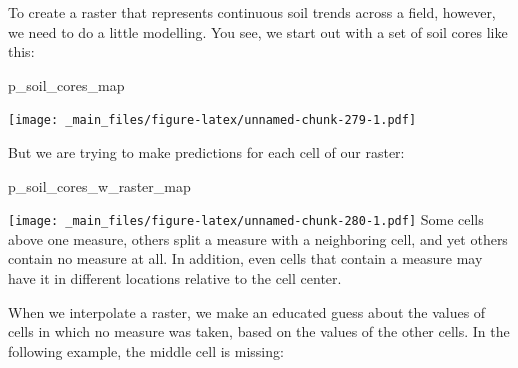 \documentclass[
]{book}
\newenvironment{Shaded}{\begin{snugshade}}{\end{snugshade}}
\newcommand{\NormalTok}[1]{#1}
\begin{document}
To create a raster that represents continuous soil trends across a field, however, we need to do a little modelling. You see, we start out with a set of soil cores like this:

\begin{Shaded}
\begin{Highlighting}[]
\NormalTok{p\_soil\_cores\_map}
\end{Highlighting}
\end{Shaded}

\texttt{[image: \_main\_files/figure-latex/unnamed-chunk-279-1.pdf]}

But we are trying to make predictions for each cell of our raster:

\begin{Shaded}
\begin{Highlighting}[]
\NormalTok{p\_soil\_cores\_w\_raster\_map}
\end{Highlighting}
\end{Shaded}

\texttt{[image: \_main\_files/figure-latex/unnamed-chunk-280-1.pdf]}
Some cells above one measure, others split a measure with a neighboring cell, and yet others contain no measure at all. In addition, even cells that contain a measure may have it in different locations relative to the cell center.

When we interpolate a raster, we make an educated guess about the values of cells in which no measure was taken, based on the values of the other cells. In the following example, the middle cell is missing:
\end{document}
